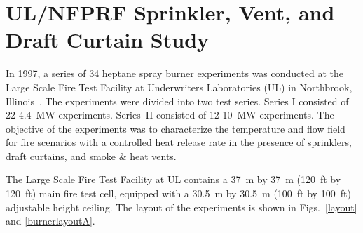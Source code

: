 \section{UL/NFPRF Sprinkler, Vent, and Draft Curtain Study}
\label{UL_NFPRF_Description}

In 1997, a series of 34 heptane spray burner experiments was conducted at the Large Scale Fire Test Facility at Underwriters Laboratories
(UL) in Northbrook, Illinois~\cite{Sheppard:1}. The experiments were divided into two test series. Series I consisted of 22 4.4~MW experiments. Series~II consisted
of 12 10~MW experiments. The objective of the experiments was to characterize the temperature and flow field for fire
scenarios with a controlled heat release rate in the presence of sprinklers, draft curtains, and smoke \& heat vents.

The Large Scale Fire Test Facility at UL contains a 37~m by 37~m (120~ft by 120~ft) main fire test cell, equipped with a 30.5~m by 30.5~m (100~ft by
100~ft) adjustable height ceiling. The layout of the experiments is shown in Figs.~\ref{layout} and \ref{burnerlayoutA}.

